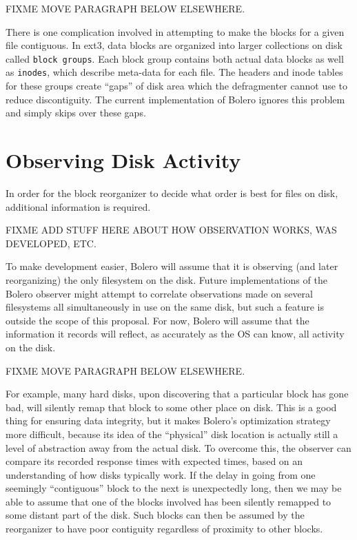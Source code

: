 \documentclass[10pt,twocolumn,letterpaper]{article}
\begin{document}
FIXME MOVE PARAGRAPH BELOW ELSEWHERE.

There is one complication involved in attempting to make the blocks for
a given file contiguous. In ext3, data blocks are organized into larger
collections on disk called \texttt{block groups}\cite{ext2intro}. Each
block group contains both actual data blocks as well as \texttt{inodes},
which describe meta-data for each file. The headers and inode tables
for these groups create ``gaps'' of disk area which the defragmenter cannot
use to reduce discontiguity. The current implementation of Bolero ignores
this problem and simply skips over these gaps.

\section{Observing Disk Activity}

In order for the block reorganizer to decide what order is best for files
on disk, additional information is required.

FIXME ADD STUFF HERE ABOUT HOW OBSERVATION WORKS, WAS DEVELOPED, ETC.

To make development easier, Bolero will assume that it is observing (and
later reorganizing) the only filesystem on the disk. Future implementations of the
Bolero observer might attempt to correlate observations
made on several filesystems all simultaneously in use on the same disk, but
such a feature is outside the scope of this proposal. For now, Bolero will assume that
the information it records will reflect, as accurately as the OS can know,
all activity on the disk.

FIXME MOVE PARAGRAPH BELOW ELSEWHERE.

For example, many hard disks, upon discovering that a particular block has gone bad, will silently
remap that block to some other place on disk\cite{remapping}. This is a good thing for ensuring
data integrity, but it makes Bolero's optimization strategy more difficult, because
its idea of the ``physical'' disk location is actually still a level of abstraction away from
the actual disk. To overcome this, the observer can compare its recorded response
times with expected times, based on an understanding of how disks typically work.
If the delay in going from one seemingly ``contiguous'' block to the next
is unexpectedly long, then we may be able to assume that one of the blocks involved
has been silently remapped to some distant part of the disk. Such blocks can then be
assumed by the reorganizer to have poor contiguity regardless of proximity to other
blocks.
\end{document}
